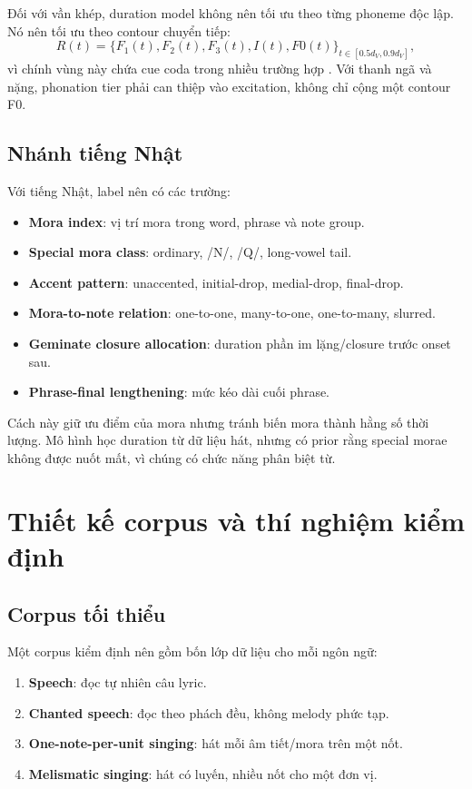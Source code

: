 \documentclass[12pt,a4paper]{article}
\begin{document}
Đối với vần khép, duration model không nên tối ưu theo từng phoneme độc lập. Nó nên tối ưu theo contour chuyển tiếp:
\[
R(t) = \{F_1(t), F_2(t), F_3(t), I(t), F0(t)\}_{t \in [0.5d_V,0.9d_V]},
\]
vì chính vùng này chứa cue coda trong nhiều trường hợp \parencite{tran2019vietnameseCoda}. Với thanh ngã và nặng, phonation tier phải can thiệp vào excitation, không chỉ cộng một contour F0.

\subsection{Nhánh tiếng Nhật}

Với tiếng Nhật, label nên có các trường:

\begin{itemize}
  \item \textbf{Mora index}: vị trí mora trong word, phrase và note group.
  \item \textbf{Special mora class}: ordinary, /N/, /Q/, long-vowel tail.
  \item \textbf{Accent pattern}: unaccented, initial-drop, medial-drop, final-drop.
  \item \textbf{Mora-to-note relation}: one-to-one, many-to-one, one-to-many, slurred.
  \item \textbf{Geminate closure allocation}: duration phần im lặng/closure trước onset sau.
  \item \textbf{Phrase-final lengthening}: mức kéo dài cuối phrase.
\end{itemize}

Cách này giữ ưu điểm của mora nhưng tránh biến mora thành hằng số thời lượng. Mô hình học duration từ dữ liệu hát, nhưng có prior rằng special morae không được nuốt mất, vì chúng có chức năng phân biệt từ.

\section{Thiết kế corpus và thí nghiệm kiểm định}

\subsection{Corpus tối thiểu}

Một corpus kiểm định nên gồm bốn lớp dữ liệu cho mỗi ngôn ngữ:

\begin{enumerate}
  \item \textbf{Speech}: đọc tự nhiên câu lyric.
  \item \textbf{Chanted speech}: đọc theo phách đều, không melody phức tạp.
  \item \textbf{One-note-per-unit singing}: hát mỗi âm tiết/mora trên một nốt.
  \item \textbf{Melismatic singing}: hát có luyến, nhiều nốt cho một đơn vị.
\end{enumerate}
\end{document}
